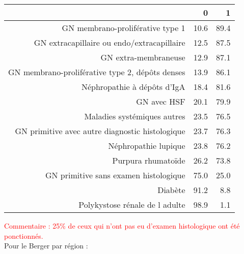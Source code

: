 \documentclass[11pt,a4paper]{article}\usepackage[]{graphicx}\usepackage[]{color}
\begin{document}
\begin{table}[H]
\centering
\begin{tabular}{rrr}
  \hline
 & 0 & 1 \\ 
  \hline
GN membrano-proliférative type 1 & 10.6 & 89.4 \\ 
  GN extracapillaire ou endo/extracapillaire & 12.5 & 87.5 \\ 
  GN extra-membraneuse & 12.9 & 87.1 \\ 
  GN membrano-proliférative type 2, dépôts denses & 13.9 & 86.1 \\ 
  Néphropathie à dépôts d'IgA & 18.4 & 81.6 \\ 
  GN avec HSF & 20.1 & 79.9 \\ 
  Maladies systémiques autres & 23.5 & 76.5 \\ 
  GN primitive avec autre diagnostic histologique & 23.7 & 76.3 \\ 
  Néphropathie lupique & 23.8 & 76.2 \\ 
  Purpura rhumatoïde & 26.2 & 73.8 \\ 
  GN primitive sans examen histologique & 75.0 & 25.0 \\ 
  Diabète & 91.2 & 8.8 \\ 
  Polykystose rénale de l adulte & 98.9 & 1.1 \\ 
   \hline
\end{tabular}
\end{table}


\textcolor{red}{Commentaire : 25\% de ceux qui n'ont pas eu d'examen histologique ont été ponctionnés.}
~\\

Pour le Berger par région :
\end{document}
